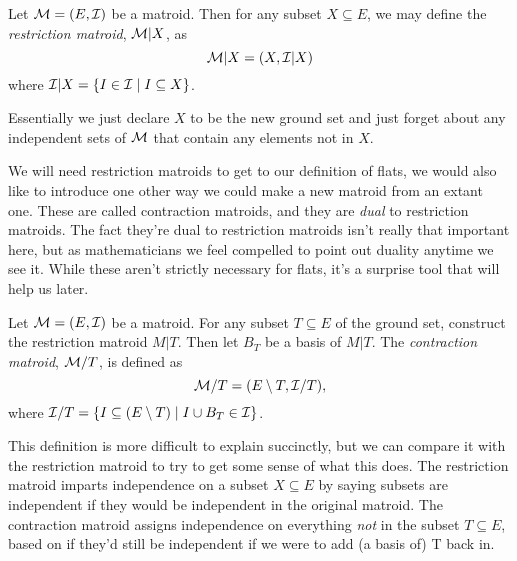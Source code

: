 \documentclass[12pt,oneside]{../../sfsuthesis}
\begin{document}
\begin{definition}\th\label{def:restrictionMatroid}
    Let \( \mathcal{M} = (E, \mathcal{I}) \) be a matroid.
    Then for any subset \( X \subseteq E \), we may define the \emph{restriction matroid}, \( \mathcal{M}|X \), as
    \[
        \mathcal{M}|X = ( X, \mathcal{I}|X )
    \]
    where \( \mathcal{I}|X = \{I \in \mathcal{I} \; | \; I \subseteq X\} \).
\end{definition}

Essentially we just declare \( X \) to be the new ground set and just forget about any independent sets of \( \mathcal{M} \) that contain any elements not in \( X \).

We will need restriction matroids to get to our definition of flats, we would also like to introduce one other way we could make a new matroid from an extant one.
These are called contraction matroids, and they are \emph{dual} to restriction matroids.
The fact they're dual to restriction matroids isn't really that important here, but as mathematicians we feel compelled to point out duality anytime we see it.
While these aren't strictly necessary for flats, it's a surprise tool that will help us later.

\begin{definition}\th\label{def:contractionMatroid}

    Let \( \mathcal{M} = (E, \mathcal{I}) \) be a matroid.
    For any subset \( T \subseteq E \) of the ground set, construct the restriction matroid \( M|T \).
    Then let \( B_T \) be a basis of \( M|T \).
    The \emph{contraction matroid}, \( \mathcal{M}/T \), is defined as
    \[
        \mathcal{M}/T = ( E \setminus T, \mathcal{I}/T ),
    \]
    where \( \mathcal{I}/T = \{ I \subseteq (E \setminus T) \; | \; I \cup B_T \in \mathcal{I} \} \).

\end{definition}

This definition is more difficult to explain succinctly, but we can compare it with the restriction matroid to try to get some sense of what this does.
The restriction matroid imparts independence on a subset \( X \subseteq E \) by saying subsets are independent if they would be independent in the original matroid.
The contraction matroid assigns independence on everything \emph{not} in the subset \( T \subseteq E \),  based on if they'd still be independent if we were to add (a basis of) T back in.
\end{document}
